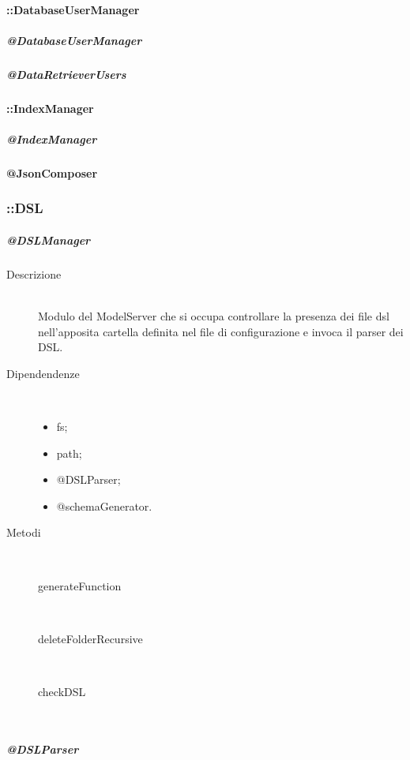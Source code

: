 \paragraph{::DatabaseUserManager}
\subparagraph{@DatabaseUserManager}
\subparagraph{@DataRetrieverUsers}

\paragraph{::IndexManager}
\subparagraph{@IndexManager}

\paragraph{@JsonComposer}

\subsubsection{::DSL}
\subparagraph{@DSLManager}
\begin{description}
 \item[Descrizione] \hfill \\
  Modulo del ModelServer che si occupa controllare la presenza dei file dsl nell'apposita cartella definita nel file di configurazione e invoca il parser dei DSL.
 \item[Dipendendenze] \hfill \\
 \begin{itemize}
 \item{fs};
  \item{path};
  \item{@DSLParser};
  \item{@schemaGenerator}.
 \end{itemize}
  
 \item[Metodi] \hfill \\
 \begin{description}
 \item[generateFunction] \hfill \\ 
 \item[deleteFolderRecursive] \hfill \\
 \item[checkDSL] \hfill \\
 \end{description}
 
\end{description}
\subparagraph{@DSLParser}
